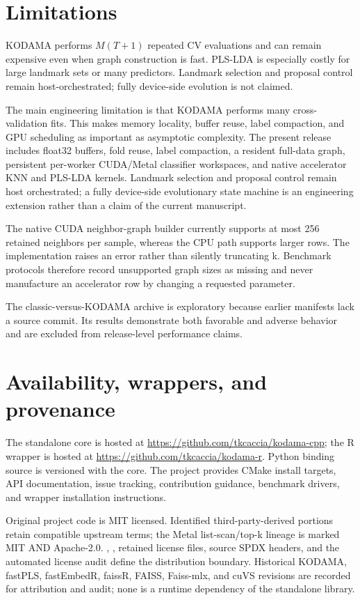 \documentclass[twoside,11pt]{article}
\begin{document}
\begin{small}
\section{Limitations}
KODAMA performs $M(T+1)$ repeated CV evaluations and can remain expensive even when graph construction is fast. PLS-LDA is especially costly for large landmark sets or many predictors. Landmark selection and proposal control remain host-orchestrated; fully device-side evolution is not claimed.

The main engineering limitation is that KODAMA performs many cross-validation fits. This makes memory locality, buffer reuse, label compaction, and GPU scheduling as important as asymptotic complexity. The present release includes float32 buffers, fold reuse, label compaction, a resident full-data graph, persistent per-worker CUDA/Metal classifier workspaces, and native accelerator KNN and PLS-LDA kernels. Landmark selection and proposal control remain host orchestrated; a fully device-side evolutionary state machine is an engineering extension rather than a claim of the current manuscript.

The native CUDA neighbor-graph builder currently supports at most 256 retained neighbors per sample, whereas the CPU path supports larger rows. The implementation raises an error rather than silently truncating k. Benchmark protocols therefore record unsupported graph sizes as missing and never manufacture an accelerator row by changing a requested parameter.

The classic-versus-KODAMA archive is exploratory because earlier manifests lack a source commit. Its results demonstrate both favorable and adverse behavior and are excluded from release-level performance claims.

\section{Availability, wrappers, and provenance}
The standalone core is hosted at \url{https://github.com/tkcaccia/kodama-cpp}; the R wrapper is hosted at \url{https://github.com/tkcaccia/kodama-r}. Python binding source is versioned with the core. The project provides CMake install targets, API documentation, issue tracking, contribution guidance, benchmark drivers, and wrapper installation instructions.

Original project code is MIT licensed. Identified third-party-derived portions retain compatible upstream terms; the Metal list-scan/top-k lineage is marked MIT AND Apache-2.0. , , retained license files, source SPDX headers, and the automated license audit define the distribution boundary. Historical KODAMA, fastPLS, fastEmbedR, faissR, FAISS, Faiss-mlx, and cuVS revisions are recorded for attribution and audit; none is a runtime dependency of the standalone library.


\end{small}
\end{document}
